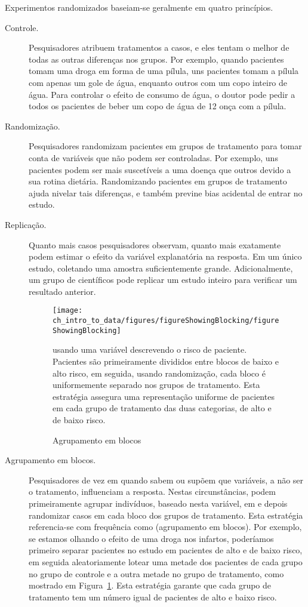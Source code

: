 Experimentos randomizados baseiam-se geralmente em quatro princípios.
\begin{description}
 \item[Controle.]
  Pesquisadores atribuem tratamentos a casos, e eles tentam o melhor de  todas as outras diferenças nos grupos.
  Por exemplo, quando pacientes tomam uma droga em forma de uma pílula, uns pacientes tomam a pílula com apenas um gole de água, enquanto outros com um copo inteiro de água.
  Para controlar o efeito de consumo de água, o doutor pode pedir a todos os pacientes de beber um copo de água de 12 onça com a pílula.
 \item[Randomização.]
  Pesquisadores randomizam pacientes em grupos de tratamento para tomar conta de variáveis que não podem ser controladas.
  Por exemplo, uns pacientes podem ser mais suscetíveis a uma doença que outros devido a sua rotina dietária.
  Randomizando pacientes em grupos de tratamento ajuda nivelar tais diferenças, e também previne bias acidental de entrar no estudo.
 \item[Replicação.]
  Quanto mais casos pesquisadores observam, quanto mais exatamente podem estimar o efeito da variável explanatória na resposta.
  Em um único estudo,  coletando uma amostra suficientemente grande.
  Adicionalmente, um grupo de científicos pode replicar um estudo inteiro para verificar um resultado anterior.

\begin{figure}
\centering
\texttt{[image: ch\_intro\_to\_data/figures/figureShowingBlocking/figureShowingBlocking]}
\caption{Agrupamento em blocos} usando uma variável descrevendo o risco de paciente.
 Pacientes são primeiramente divididos entre blocos de baixo e alto risco, em seguida, usando randomização, cada bloco é uniformemente separado nos grupos de tratamento.
 Esta estratégia assegura uma representação uniforme de pacientes em cada grupo de tratamento das duas categorias, de alto e de baixo risco.
\label{figureShowingBlocking}
\end{figure}

\item[Agrupamento em blocos.]
 Pesquisadores de vez em quando sabem ou supõem que variáveis, a não ser o tratamento, influenciam a resposta.
 Nestas circunstâncias, podem primeiramente agrupar indivíduos, baseado nesta variável, em  e depois randomizar casos em cada bloco dos grupos de tratamento.
 Esta estratégia referencia-se com frequência como  (agrupamento em blocos).
 Por exemplo, se estamos olhando o efeito de uma droga nos infartos, poderíamos primeiro separar pacientes no estudo em pacientes de alto e de baixo risco, em seguida aleatoriamente lotear uma metade dos pacientes de cada grupo no grupo de controle e a outra metade no grupo de tratamento, como mostrado em Figura~\ref{figureShowingBlocking}.
 Esta estratégia garante que cada grupo de tratamento tem um número igual de pacientes de alto e baixo risco.
\end{description}

